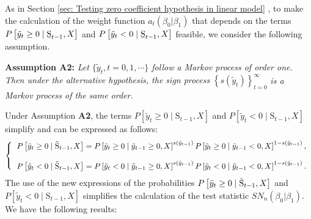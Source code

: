 \documentclass[harvard,11pt]{article}
\begin{document}
As in Section \ref{sec: Testing zero coefficient hypothesis in linear model}%
, to make the calculation of the weight function $a_{t}(\beta _{0}|\beta
_{1})$ that depends on the terms $P\left[ \tilde{y}_{t}\geq 0\mid \text{\b{S%
}}_{t-1},X\right] $ and $P\left[ \tilde{y}_{t}<0\mid \text{\b{S}}%
_{t-1},X\right] $ feasible, we consider the following assumption.\newline

\noindent \textbf{Assumption A2: }\textit{Let $\{\tilde{y}_t,t=0,1,\cdots\}$ follow a Markov process of order one. Then under the alternative hypothesis, the sign process }$\left\{
s(\tilde{y}_{t})\right\} _{t=0}^{\infty }$\textit{ is a Markov process of the same order.}\newline

Under Assumption \textbf{A2}, the terms $P\left[ \tilde{y}_{t}\geq
0\mid \text{\~{S}}_{t-1},X\right] $ and $P\left[ \tilde{y}_{t}<0\mid 
\text{\~{S}}_{t-1},X\right] $ simplify and can be expressed as
follows:%
\begin{equation*}
\left\{ 
\begin{tabular}{l}
$P\left[ \tilde{y}_{t}\geq 0\mid \text{\~{S}}_{t-1},X\right] =%
P\left[ \tilde{y}_{t}\geq 0\mid \tilde{y}_{t-1}\geq 0,X\right] ^{s(\tilde{y}%
_{t-1})}P\left[ \tilde{y}_{t}\geq 0\mid \tilde{y}_{t-1}<0,X\right]
^{1-s(\tilde{y}_{t-1})},$ \\ 
\\ 
$P\left[ \tilde{y}_{t}<0\mid \text{\~{S}}_{t-1},X\right] =P%
\left[ \tilde{y}_{t}<0\mid \tilde{y}_{t-1}\geq 0,X\right] ^{s(\tilde{y}_{t-1})}%
P\left[ \tilde{y}_{t}<0\mid \tilde{y}_{t-1}<0,X\right] ^{1-s(\tilde{y}%
_{t-1})}.$%
\end{tabular}%
\right.
\end{equation*}%
The use of the new expressions of the probabilities $P\left[ \tilde{%
y}_{t}\geq 0\mid \text{\~{S}}_{t-1},X\right] $ and $P\left[ \tilde{y}%
_{t}<0\mid \text{\~{S}}_{t-1},X\right] $ simplifies the calculation of the
test statistic $SN_{n}(\beta _{0}|\beta _{1})$. We have the following results:
\end{document}
